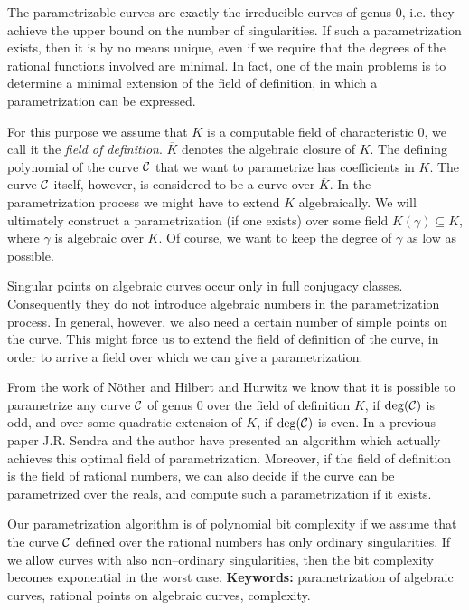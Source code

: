 \vspace{2 mm}

The parametrizable curves are exactly the irreducible curves of
genus 0, i.e. they achieve the upper bound on the number of 
singularities.
If such a parametrization exists, then it
is by no means unique, even if we require that the degrees of the
rational functions involved are minimal. In fact, one of the main 
problems is to determine a minimal extension of the field of definition,
in which a parametrization can be expressed.

For this purpose we assume that $K$ is a computable field of
characteristic 0, we call it the {\it field of definition}.
$\overline K$ denotes the algebraic closure of $K$.
The defining polynomial of the curve $\cal C$ that we want to
parametrize has coefficients in $K$.
The curve $\cal C$ itself, however, is considered to be a curve
over $\overline K$.
In the parametrization process  we might have to
extend $K$ algebraically. We will ultimately construct a
parametrization (if one exists) over some field 
$K(\gamma) \subseteq \overline K$, where $\gamma$ is algebraic
over $K$.
Of course, we want to keep  the degree of $\gamma$ as low as possible.

\vspace{2 mm} 

Singular points on algebraic curves occur only in full conjugacy  classes.
Consequently they do not introduce algebraic numbers in the
parametrization process. In general, however, we also need 
a certain number of simple points on the curve. This might force us
to extend the field of definition of the curve, in order to
arrive a field over which we can give a parametrization.


From the work of N\"other              and
Hilbert and Hurwitz                 we
know that it is possible to parametrize any curve $\cal C$ of genus 0
over the field of definition $K$, if $\deg({\cal C})$ is odd,
and over some quadratic extension of $K$, if $\deg({\cal C})$ is even.
In a previous paper J.R. Sendra and the author have presented an 
algorithm which actually achieves this optimal field of 
parametrization.
Moreover, if the field of definition is the field of rational
numbers, we can also
decide if the curve can be parametrized over the reals, and compute
such a parametrization if it exists.

\vspace {2 mm}

Our parametrization algorithm is of polynomial bit complexity
if we assume that the curve $\cal C$ defined over the rational numbers
has only ordinary singularities.
If we allow curves with also non--ordinary singularities, then
the bit complexity 
becomes exponential in the worst case.
\vspace{2 mm}
\newline
{\bf Keywords:} parametrization of algebraic curves, rational points on 
algebraic curves, complexity.





